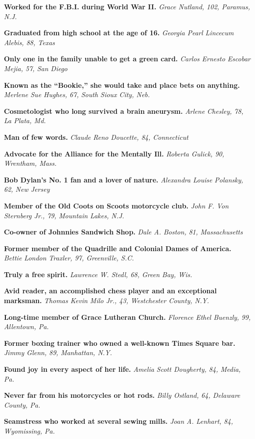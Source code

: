 \textbf{Worked for the F.B.I. during World War II.} \emph{Grace Nutland,
102, Paramus, N.J.}

\textbf{Graduated from high school at the age of 16.} \emph{Georgia
Pearl Lincecum Alebis, 88, Texas}

\textbf{Only one in the family unable to get a green card.} \emph{Carlos
Ernesto Escobar Mejia, 57, San Diego}

\textbf{Known as the ``Bookie,'' she would take and place bets on
anything.} \emph{Merlene Sue Hughes, 67, South Sioux City, Neb.}

\textbf{Cosmetologist who long survived a brain aneurysm.} \emph{Arlene
Chesley, 78, La Plata, Md.}

\textbf{Man of few words.} \emph{Claude Reno Doucette, 84, Connecticut}

\textbf{Advocate for the Alliance for the Mentally Ill.} \emph{Roberta
Gulick, 90, Wrentham, Mass.}

\textbf{Bob Dylan's No. 1 fan and a lover of nature.} \emph{Alexandra
Louise Polansky, 62, New Jersey}

\textbf{Member of the Old Coots on Scoots motorcycle club.} \emph{John
F. Von Sternberg Jr., 79, Mountain Lakes, N.J.}

\textbf{Co-owner of Johnnies Sandwich Shop.} \emph{Dale A. Boston, 81,
Massachusetts}

\textbf{Former member of the Quadrille and Colonial Dames of America.}
\emph{Bettie London Traxler, 97, Greenville, S.C.}

\textbf{Truly a free spirit.} \emph{Lawrence W. Stedl, 68, Green Bay,
Wis.}

\textbf{Avid reader, an accomplished chess player and an exceptional
marksman.} \emph{Thomas Kevin Milo Jr., 43, Westchester County, N.Y.}

\textbf{Long-time member of Grace Lutheran Church.} \emph{Florence Ethel
Buenzly, 99, Allentown, Pa.}

\textbf{Former boxing trainer who owned a well-known Times Square bar.}
\emph{Jimmy Glenn, 89, Manhattan, N.Y.}

\textbf{Found joy in every aspect of her life.} \emph{Amelia Scott
Dougherty, 84, Media, Pa.}

\textbf{Never far from his motorcycles or hot rods.} \emph{Billy
Ostland, 64, Delaware County, Pa.}

\textbf{Seamstress who worked at several sewing mills.} \emph{Joan A.
Lenhart, 84, Wyomissing, Pa.}

